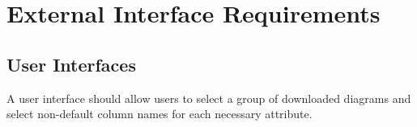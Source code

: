 \section{External Interface Requirements}
\subsection{User Interfaces}
A user interface should allow users to select a group of downloaded diagrams and select non-default column names for each necessary attribute.

